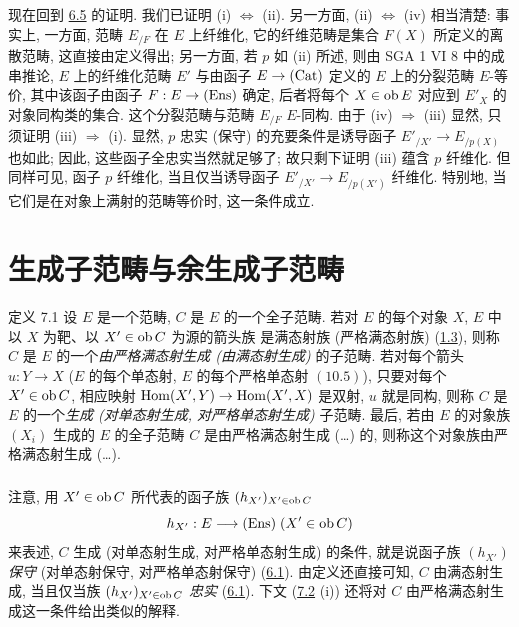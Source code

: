 现在回到 \hyperref[I.prop6.5]{6.5} 的证明. 我们已证明
(i) $\Leftrightarrow$ (ii). 另一方面, (ii) $\Leftrightarrow$ (iv) 相当清楚:
事实上, 一方面, 范畴 $E_{/F}$ 在 $E$ 上纤维化,
它的纤维范畴是集合 $F(X)$ 所定义的离散范畴, 这直接由定义得出;
另一方面, 若 $p$ 如 (ii) 所述, 则由 SGA 1 VI 8 中的成串推论,
$E$ 上的纤维化范畴 $E'$ 与由函子 $E\rightarrow (\operatorname{Cat})$
定义的 $E$ 上的分裂范畴 $E$-等价,
其中该函子由函子 $F:E\rightarrow (\operatorname{Ens})$ 确定,
后者将每个 $X\in \operatorname{ob} E$ 对应到 $E'_X$ 的对象同构类的集合.
这个分裂范畴与范畴 $E_{/F}$ $E$-同构.
由于 (iv) $\Rightarrow$ (iii) 显然, 只须证明 (iii) $\Rightarrow$ (i).
显然, $p$ 忠实 (\resp 保守) 的充要条件是诱导函子
$E'_{/X'}\rightarrow E_{/p(X)}$ 也如此;
因此, 这些函子全忠实当然就足够了; 故只剩下证明 (iii) 蕴含 $p$ 纤维化.
但同样可见, 函子 $p$ 纤维化, 当且仅当诱导函子
$E'_{/X'}\rightarrow E_{/p(X')}$ 纤维化.
特别地, 当它们是在对象上满射的范畴等价时, 这一条件成立.




\section{生成子范畴与余生成子范畴}\pageoriginale

\begin{enonce*}{定义 7.1}
设 $E$ 是一个范畴, $C$ 是 $E$ 的一个全子范畴.
若对 $E$ 的每个对象 $X$, $E$ 中以 $X$ 为靶、以 $X'\in \operatorname{ob} C$ 为源的箭头族
是满态射族 (\resp 严格满态射族) (\hyperref[I.condef1.3]{1.3}),
则称 $C$ 是 $E$ 的一个\emph{由严格满态射生成 (\resp 由满态射生成)} 的子范畴.
若对每个箭头 $u:Y\rightarrow X$
(\resp $E$ 的每个单态射, \resp $E$ 的每个严格单态射 $\hyperref[I.sec10.5]{(10.5)}$),
只要对每个 $X'\in \operatorname{ob} C$, 相应映射 $\operatorname{Hom}(X',Y)\rightarrow \operatorname{Hom}(X',X)$
是双射, $u$ 就是同构, 则称 $C$ 是 $E$ 的一个\emph{生成
(\resp 对单态射生成, \resp 对严格单态射生成)} 子范畴.
最后, 若由 $E$ 的对象族 $(X_i)$ 生成的 $E$ 的全子范畴 $C$
是由严格满态射生成 (\resp \ldots) 的,
则称这个对象族由严格满态射生成 (\resp \ldots).
\end{enonce*}

\setcounter{subsection}{1} \setcounter{subsubsection}{0}
\subsubsection{}
注意, 用 $X'\in \operatorname{ob} C$ 所代表的函子族 $(h_{X'})_{X'\in \operatorname{ob} C}$
$$
h_{X'}:E\longrightarrow (\operatorname{Ens})\; (X'\in \operatorname{ob} C)
$$
来表述, $C$ 生成 (\resp 对单态射生成, \resp 对严格单态射生成) 的条件,
就是说函子族 $(h_{X'})$ \emph{保守}
(\resp 对单态射保守, \resp 对严格单态射保守)
(\hyperref[I.def6.1]{6.1}). 由定义还直接可知,
$C$ 由满态射生成, 当\pageoriginale 且仅当族 $(h_{X'})_{X'\in \operatorname{ob} C}$
\emph{忠实} (\hyperref[I.def6.1]{6.1}).
下文 (\hyperref[I.prop7.2]{7.2} (i)) 还将对 $C$ 由严格满态射生成这一条件给出类似的解释.

